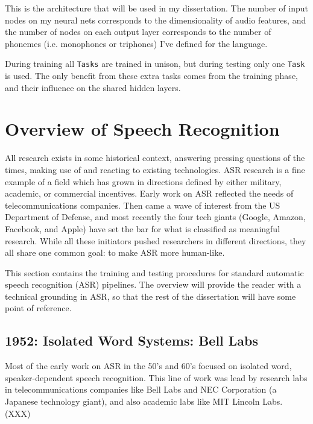 \documentclass[10pt,a4paper]{article}
\begin{document}
This is the architecture that will be used in my dissertation. The number of input nodes on my neural nets corresponds to the dimensionality of audio features, and the number of nodes on each output layer corresponds to the number of phonemes (i.e. monophones or triphones) I've defined for the language.

During training all \texttt{Tasks} are trained in unison, but during testing only one \texttt{Task} is used. The only benefit from these extra tasks comes from the training phase, and their influence on the shared hidden layers.




















\newpage

\section{Overview of Speech Recognition}

All research exists in some historical context, answering pressing questions of the times, making use of and reacting to existing technologies. ASR research is a fine example of a field which has grown in directions defined by either military, academic, or commercial incentives. Early work on ASR reflected the needs of telecommunications companies. Then came a wave of interest from the US Department of Defense, and most recently the four tech giants (Google, Amazon, Facebook, and Apple) have set the bar for what is classified as meaningful research. While all these initiators pushed researchers in different directions, they all share one common goal: to make ASR more human-like.

This section contains the training and testing procedures for standard automatic speech recognition (ASR) pipelines. The overview will provide the reader with a technical grounding in ASR, so that the rest of the dissertation will have some point of reference. 

\subsection{1952: Isolated Word Systems: Bell Labs}
Most of the early work on ASR in the 50's and 60's focused on isolated word, speaker-dependent speech recognition. This line of work was lead by research labs in telecommunications companies like Bell Labs and NEC Corporation (a Japanese technology giant), and also academic labs like MIT Lincoln Labs. (XXX)
\end{document}
